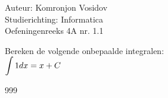 \documentclass[a4paper]{article}
\newcommand{\dint}{\displaystyle\int}
\begin{document}
	
	\noindent \large Auteur: Komronjon Vosidov \\
	\noindent \large Studierichting: Informatica\\
	\noindent \large Oefeningenreeks 4A nr. 1.1\\
	
	\medskip
	
	\normalsize
	Bereken de volgende onbepaalde integralen:\\
	
	$\dint 1 dx = x + C \\ $
	
	
		
	
	
	
\begin{thebibliography}{999}
\end{thebibliography}		
\end{document}
